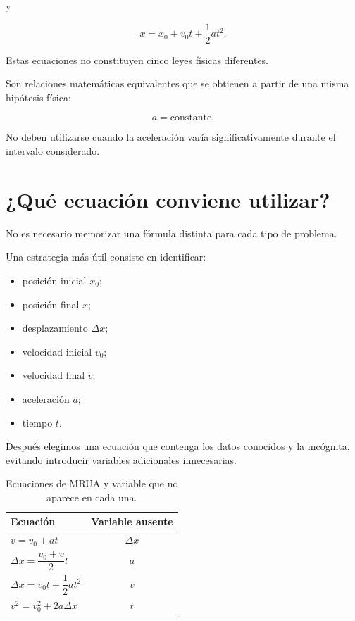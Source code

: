 y

\[
\boxed{x=x_0+v_0t+\frac{1}{2}at^2}.
\]

\begin{advertencia}
Estas ecuaciones no constituyen cinco leyes físicas diferentes.

Son relaciones matemáticas equivalentes que se obtienen a partir de una
misma hipótesis física:

\[
\boxed{a=\text{constante}}.
\]

No deben utilizarse cuando la aceleración varía significativamente durante
el intervalo considerado.
\end{advertencia}


\section{¿Qué ecuación conviene utilizar?}

No es necesario memorizar una fórmula distinta para cada tipo de problema.

Una estrategia más útil consiste en identificar:

\begin{itemize}
    \item posición inicial \(x_0\);
    \item posición final \(x\);
    \item desplazamiento \(\Delta x\);
    \item velocidad inicial \(v_0\);
    \item velocidad final \(v\);
    \item aceleración \(a\);
    \item tiempo \(t\).
\end{itemize}

Después elegimos una ecuación que contenga los datos conocidos y la
incógnita, evitando introducir variables adicionales innecesarias.

\begin{table}[H]
    \centering

    \caption{Ecuaciones de MRUA y variable que no aparece en cada una.}

    \begin{tabular}{lc}
        \toprule
        Ecuación & Variable ausente \\
        \midrule
        \(v=v_0+at\) & \(\Delta x\) \\
        \(\Delta x=\dfrac{v_0+v}{2}t\) & \(a\) \\
        \(\Delta x=v_0t+\dfrac{1}{2}at^2\) & \(v\) \\
        \(v^2=v_0^2+2a\Delta x\) & \(t\) \\
        \bottomrule
    \end{tabular}
\end{table}

